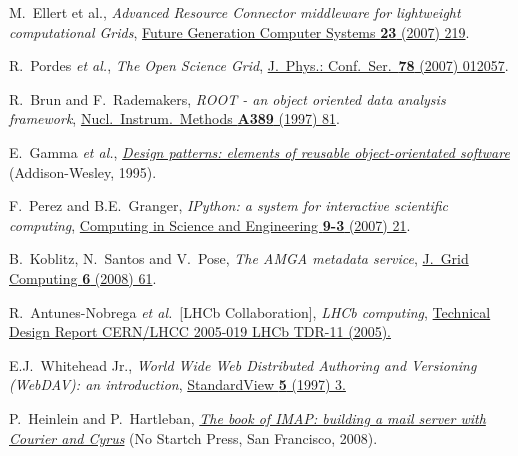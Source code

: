 \documentclass{elsart}
\def\etal {\textit{et al.}}
\begin{document}
\begin{thebibliography}{00}
 M.~Ellert et al.,
\textit{Advanced Resource Connector middleware for lightweight
computational Grids},
\href{http://dx.doi.org/10.1016/j.future.2006.05.008}
{Future Generation Computer Systems \textbf{23} (2007) 219}.
  

 R.~Pordes \etal,
\textit{The Open Science Grid},
\href{http://dx.doi.org/10.1088/1742-6596/78/1/012057}
{J.~Phys.: Conf.\ Ser.\ \textbf{78} (2007) 012057}.

 R.~Brun and F.~Rademakers,
\textit{ROOT - an object oriented data analysis framework},
\href{http://dx.doi.org/10.1016/S0168-9002(97)00048-X}
{Nucl.\ Instrum.\ Methods \textbf{A389} (1997) 81}.

  E.~Gamma \etal,
  \href{http://www.pearsonhighered.com/educator/academic/product/0,,0201633612,00%2Ben-USS_01DBC.html}
{\textit{Design patterns: elements of reusable object-orientated software}}
(Addison-Wesley, 1995).

 F.~Perez and B.E.~Granger,
\textit{IPython: a system for interactive scientific computing},
\href{http://dx.doi.org/10.1109/MCSE.2007.53}
{Computing in Science and Engineering \textbf{9-3} (2007) 21}.

 B.~Koblitz, N.~Santos and V.~Pose,
\textit{The AMGA metadata service},
\href{http://dx.doi.org/10.1007/s10723-007-9084-6}
{J.~Grid Computing \textbf{6} (2008) 61}.

R.~Antunes-Nobrega \etal\ [LHCb Collaboration],
\textit{LHCb computing},
\href{http://cdsweb.cern.ch/record/835156}
{Technical Design Report CERN/LHCC 2005-019 LHCb TDR-11 (2005).}

 E.J.~Whitehead Jr.,
\textit{World Wide Web Distributed Authoring and Versioning (WebDAV):
an introduction},
\href{http://dx.doi.org/10.1145/253452.253458}
{StandardView \textbf{5} (1997) 3.}

 P.~Heinlein and P.~Hartleban,
\href{http://nostarch.com/imap.htm}
{\textit{The book of IMAP: building a mail server with Courier and Cyrus}}
(No Startch Press, San Francisco, 2008).


\end{thebibliography}
\end{document}
